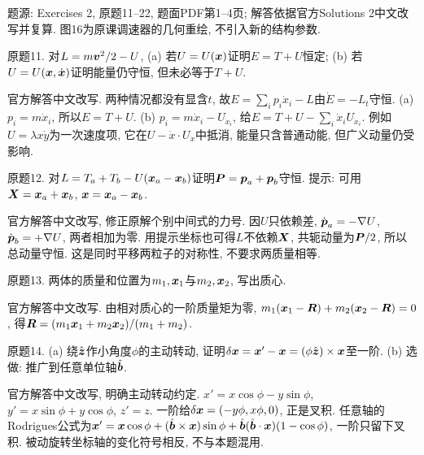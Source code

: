 题源: Exercises 2, 原题11--22, 题面PDF第1--4页; 解答依据官方Solutions 2中文改写并复算. 图16为原课调速器的几何重绘, 不引入新的结构参数.

\begin{exercise}
原题11. 对$L=m\boldsymbol{v}^2/2-U$, (a) 若$U=U(\boldsymbol{x})$证明$E=T+U$恒定; (b) 若$U=U(\boldsymbol{x},\dot{\boldsymbol{x}})$证明能量仍守恒, 但未必等于$T+U$.
\end{exercise}
\begin{solution}
官方解答中文改写. 两种情况都没有显含$t$, 故$E=\sum_ip_i\dot x_i-L$由$\dot E=-L_t$守恒. (a) $p_i=m\dot x_i$, 所以$E=T+U$. (b) $p_i=m\dot x_i-U_{\dot x_i}$, 给$E=T+U-\sum_i\dot x_iU_{\dot x_i}$. 例如$U=\lambda x\dot y$为一次速度项, 它在$U-\dot x\cdot U_{\dot x}$中抵消, 能量只含普通动能, 但广义动量仍受影响.
\end{solution}

\begin{exercise}
原题12. 对$L=T_a+T_b-U(\boldsymbol{x}_a-\boldsymbol{x}_b)$证明$\boldsymbol{P}=\boldsymbol{p}_a+\boldsymbol{p}_b$守恒. 提示: 可用$\boldsymbol{X}=\boldsymbol{x}_a+\boldsymbol{x}_b$, $\boldsymbol{x}=\boldsymbol{x}_a-\boldsymbol{x}_b$.
\end{exercise}
\begin{solution}
官方解答中文改写, 修正原解个别中间式的力号. 因$U$只依赖差, $\dot{\boldsymbol{p}}_a=-\nabla U$, $\dot{\boldsymbol{p}}_b=+\nabla U$, 两者相加为零. 用提示坐标也可得$L$不依赖$\boldsymbol{X}$, 共轭动量为$\boldsymbol{P}/2$, 所以总动量守恒. 这是同时平移两粒子的对称性, 不要求两质量相等.
\end{solution}

\begin{exercise}
原题13. 两体的质量和位置为$m_1,\boldsymbol{x}_1$与$m_2,\boldsymbol{x}_2$, 写出质心.
\end{exercise}
\begin{solution}
官方解答中文改写. 由相对质心的一阶质量矩为零, $m_1(\boldsymbol{x}_1-\boldsymbol{R})+m_2(\boldsymbol{x}_2-\boldsymbol{R})=0$, 得$\boldsymbol{R}=(m_1\boldsymbol{x}_1+m_2\boldsymbol{x}_2)/(m_1+m_2)$.
\end{solution}

\begin{exercise}
原题14. (a) 绕$\hat{\boldsymbol{z}}$作小角度$\phi$的主动转动, 证明$\delta\boldsymbol{x}=\boldsymbol{x}'-\boldsymbol{x}=(\phi\hat{\boldsymbol{z}})\times\boldsymbol{x}$至一阶. (b) 选做: 推广到任意单位轴$\hat{\boldsymbol{b}}$.
\end{exercise}
\begin{solution}
官方解答中文改写, 明确主动转动约定. $x'=x\cos\phi-y\sin\phi$, $y'=x\sin\phi+y\cos\phi$, $z'=z$. 一阶给$\delta\boldsymbol{x}=(-y\phi,x\phi,0)$, 正是叉积. 任意轴的Rodrigues公式为$\boldsymbol{x}'=\boldsymbol{x}\cos\phi+(\hat{\boldsymbol{b}}\times\boldsymbol{x})\sin\phi+\hat{\boldsymbol{b}}(\hat{\boldsymbol{b}}\cdot\boldsymbol{x})(1-\cos\phi)$, 一阶只留下叉积. 被动旋转坐标轴的变化符号相反, 不与本题混用.
\end{solution}

